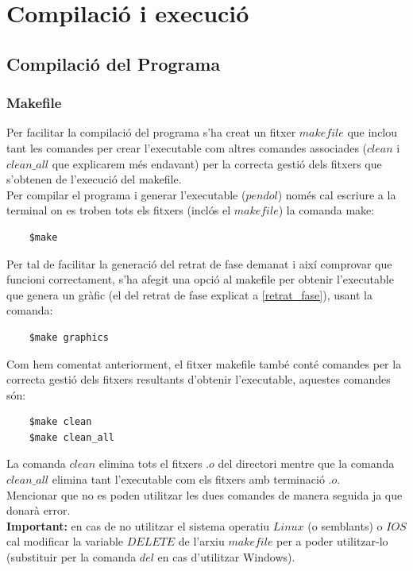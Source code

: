 \documentclass[a4paper, 11pt]{article}
\begin{document}
\newpage
\section{Compilació i execució}
\subsection{Compilació del Programa}
\subsubsection{Makefile}
Per facilitar la compilació del programa s'ha creat un fitxer $makefile$ que inclou tant les comandes per crear l'executable com altres comandes associades ($clean$ i $clean\_all$ que explicarem més endavant) per la correcta gestió dels fitxers que s'obtenen de l'execució del makefile.\\
Per compilar el programa i generar l'executable ($pendol$) només cal escriure a la terminal on es troben tots els fitxers (inclós el $makefile$) la comanda make: 
\begin{verbatim}
    $make
\end{verbatim}
Per tal de facilitar la generació del retrat de fase demanat i així comprovar que funcioni correctament, s'ha afegit una opció al makefile per obtenir l'executable que genera un gràfic (el del retrat de fase explicat a \textcolor{blue}{\ref{retrat_fase}}), usant la comanda:
\begin{verbatim}
    $make graphics
\end{verbatim}
Com hem comentat anteriorment, el fitxer makefile també conté comandes per la correcta gestió dels fitxers resultants d'obtenir l'executable, aquestes comandes són:
\begin{verbatim}
    $make clean
    $make clean_all
\end{verbatim}
La comanda $clean$ elimina tots el fitxers $.o$ del directori mentre que la comanda $clean\_all$ elimina tant l'executable com els fitxers amb terminació $.o$.\\
Mencionar que no es poden utilitzar les dues comandes de manera seguida ja que donarà error.\\
\textbf{Important:} en cas de no utilitzar el sistema operatiu $Linux$ (o semblants) o $IOS$ cal modificar la variable $DELETE$ de l'arxiu $makefile$ per a poder utilitzar-lo (substituir per la comanda $del$ en cas d'utilitzar Windows).
\newpage
\end{document}
